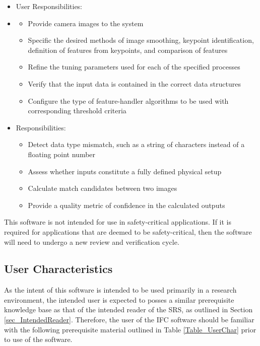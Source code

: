 \documentclass[12pt]{article}
\begin{document}
\begin{itemize}
\item User Responsibilities:
\item %
\begin{itemize}
\item Provide camera images to the system
\item Specific the desired methods of image smoothing, keypoint identification, definition of features from keypoints, and comparison of features
\item Refine the tuning parameters used for each of the specified processes
\item Verify that the input data is contained in the correct data structures
\item Configure the type of feature-handler algorithms to be used with corresponding 
threshold criteria
\end{itemize}
\item \progname{} Responsibilities:
\begin{itemize}
\item Detect data type mismatch, such as a string of characters instead of a floating point number
\item Assess whether inputs constitute a fully defined physical setup
\item Calculate match candidates between two images
\item Provide a quality metric of confidence in the calculated outputs
\end{itemize}
\end{itemize}
This software is not intended for use in safety-critical applications. If it is required for 
applications that are deemed to be safety-critical, then the software will need to undergo a new 
review and verification cycle.

\subsection{User Characteristics} \label{SecUserCharacteristics}
As the intent of this software is intended to be used primarily in a research environment, 
the intended user is expected to posses a similar prerequisite knowledge base as that of the 
intended reader of the SRS, as outlined in Section \ref{sec_IntendedReader}. Therefore, the 
user of the IFC software should be familiar with the following prerequisite material outlined 
in Table \ref{Table_UserChar} prior to use of the software. 
\end{document}
